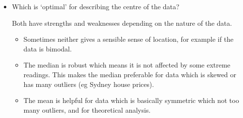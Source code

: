 \documentclass[t,xcolor=pdftex,dvipsnames,table]{beamer}\usepackage[]{graphicx}\usepackage[]{color}
\makeatletter
\def\maxwidth{ %
  \ifdim\Gin@nat@width>\linewidth
    \linewidth
  \else
    \Gin@nat@width
  \fi
}
\newcommand{\hlnum}[1]{\textcolor[rgb]{0.686,0.059,0.569}{#1}}%
\newcommand{\hlopt}[1]{\textcolor[rgb]{0,0,0}{#1}}%
\newcommand{\hlstd}[1]{\textcolor[rgb]{0.345,0.345,0.345}{#1}}%
\newcommand{\hlkwb}[1]{\textcolor[rgb]{0.69,0.353,0.396}{#1}}%
\newcommand{\hlkwc}[1]{\textcolor[rgb]{0.333,0.667,0.333}{#1}}%
\newcommand{\hlkwd}[1]{\textcolor[rgb]{0.737,0.353,0.396}{\textbf{#1}}}%
\newenvironment{kframe}{%
 \def\at@end@of@kframe{}%
 \ifinner\ifhmode%
  \def\at@end@of@kframe{\end{minipage}}%
  \begin{minipage}{\columnwidth}%
 \fi\fi%
 \def\FrameCommand##1{\hskip\@totalleftmargin \hskip-\fboxsep
 \colorbox{shadecolor}{##1}\hskip-\fboxsep
     \hskip-\linewidth \hskip-\@totalleftmargin \hskip\columnwidth}%
 \MakeFramed {\advance\hsize-\width
   \@totalleftmargin\z@ \linewidth\hsize
   \@setminipage}}%
 {\par\unskip\endMakeFramed%
 \at@end@of@kframe}
\newenvironment{knitrout}{}{} %
\makeatother
\begin{document}
\begin{frame}
\begin{itemize}
\item
Which is ‘optimal’ for describing the centre of the data? 

\vspace{.5cm}
Both have strengths and weaknesses depending on the nature of the data. 
\begin{itemize}
\item Sometimes neither gives a sensible sense of location, for example if the data is bimodal.
\item The median is robust which means it is not affected by some extreme readings. This makes the median preferable for data which is skewed or has many outliers (eg Sydney house prices). 
\item The mean is helpful for data which is basically symmetric which not too many outliers, and for theoretical analysis.
\end{itemize}
\end{itemize}
\end{frame}

\end{document}
